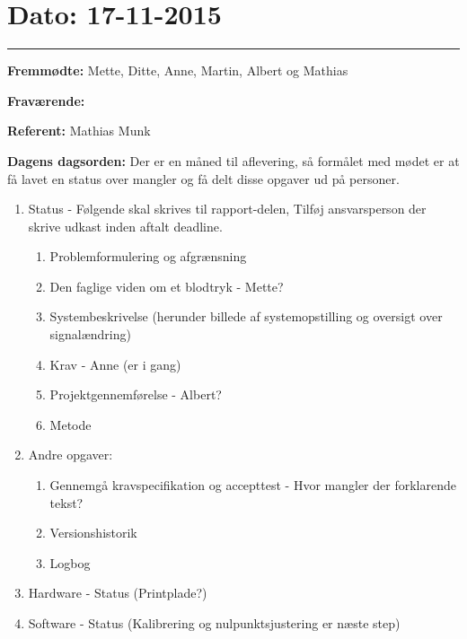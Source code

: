 \section{Dato: 17-11-2015}
\hrule

\textbf{Fremmødte:} Mette, Ditte, Anne, Martin, Albert og Mathias 

\textbf{Fraværende:}

\textbf{Referent:} Mathias Munk

\textbf{Dagens dagsorden:}
Der er en måned til aflevering, så formålet med mødet er at få lavet en status over mangler og få delt disse opgaver ud på personer.
\begin{enumerate}
\item Status - Følgende skal skrives til rapport-delen, Tilføj ansvarsperson der skrive udkast inden aftalt deadline.
\begin{enumerate}
\item Problemformulering og afgrænsning
\item Den faglige viden om et blodtryk - Mette?
\item Systembeskrivelse (herunder billede af systemopstilling og oversigt over signalændring)
\item Krav - Anne (er i gang)
\item Projektgennemførelse - Albert?
\item Metode
\end{enumerate}
\item Andre opgaver:
\begin{enumerate}
\item Gennemgå kravspecifikation og accepttest - Hvor mangler der forklarende tekst?
\item Versionshistorik
\item Logbog
\end{enumerate}
\item Hardware - Status (Printplade?)
\item Software - Status (Kalibrering og nulpunktsjustering er næste step)
\end{enumerate}

